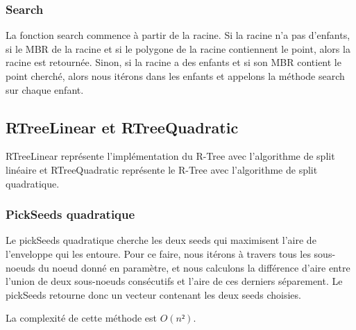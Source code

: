 \documentclass[utf8]{article}
\begin{document}
\begin{large}
    \par
    \subsubsection{Search}
    \par
    \indent
    La fonction search commence à partir de la racine. Si la racine n'a pas
    d'enfants, si le MBR de la racine et si le polygone de la racine contiennent
    le point, alors la racine est retournée. Sinon, si la racine a des enfants et
    si son MBR contient le point cherché, alors nous itérons dans les enfants et
    appelons la méthode search sur chaque enfant.

    \par
    \subsection{RTreeLinear et RTreeQuadratic}\label{RTreeLinear}
    \par
    \indent

    RTreeLinear représente l'implémentation du R-Tree avec l'algorithme de split
    linéaire et RTreeQuadratic représente le R-Tree avec l'algorithme de split quadratique.
    \par

    \subsubsection{PickSeeds quadratique}\label{PickSeeds quadratique}
    \par
    \indent
    Le pickSeeds quadratique cherche les deux seeds qui maximisent l'aire de l'enveloppe qui les entoure.
    Pour ce faire, nous itérons à travers tous les sous-noeuds du noeud donné en paramètre,
    et nous calculons la différence d'aire entre l'union de deux sous-noeuds consécutifs et l'aire de
    ces derniers séparement.
    Le pickSeeds retourne donc un vecteur contenant les deux seeds choisies.
    \par
    \indent
    La complexité de cette méthode est $O(n²)$.
    \par

\end{large}
\end{document}

